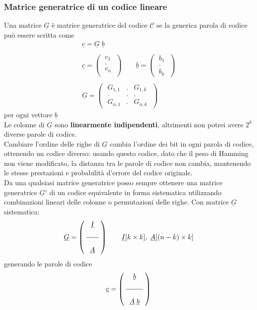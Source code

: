 \documentclass{article}
\begin{document}
\subsubsection{Matrice generatrice di un codice lineare}
Una matrice $\underline{G}$ è matrice generatrice del codice $\mathcal{C}$ se la generica parola di codice può essere scritta come 
\begin{gather*}
	\underline{c}=\underline{G}\;\underline{b}\\\\
	\underline{c}=
	\left (\;
	\begin{array}{c}
		c_1\\
		.\\
		c_n\\
	\end{array}
	\;\right )\qquad
	\underline{b}=
	\left(\;
	\begin{array}{c}
		b_1\\
		.\\
		b_k
	\end{array}
	\;\right)\\\\
	\underline{G}=
	\left(\;
	\begin{array}{ccc}
		G_{1,1}&.&G_{1,k}\\
		.&.&.\\
		G_{n,1}&.&G_{n,k}
	\end{array}
	\;\right
	)
\end{gather*}
per ogni vettore $\underline{b}$\\
Le colonne di $\underline{G}$ sono \textbf{linearmente indipendenti}, altrimenti non potrei avere $2^k$ diverse parole di codice.\\
Cambiare l'ordine delle righe di $\underline{G}$ cambia l'ordine dei bit in ogni parola di codice, ottenendo un codice diverso: usando questo codice, dato che il peso di Hamming non viene modificato, la distanza tra le parole di codice non cambia, mantenendo le stesse prestazioni e probabilità d'errore del codice originale.\\
Da una qualsiasi matrice generatrice posso sempre ottenere una matrice generatrice $\underline{G}'$ di un codice equivalente in forma sistematica utilizzando combinazioni lineari delle colonne o permutazioni delle righe.\newpage
Con matrice $\underline{G}$ sistematica:
$$\underline{G}=
\left(\;\begin{array}{c}\underline{I}\\\\
	\hline\\
	\underline{A}
\end{array}\;\right)\qquad\underline{I}[k\times k],\;\underline{A}[(n-k)\times k]$$
generando le parole di codice
$$\underline{c}=
\left(\;\begin{array}{c}\underline{b}\\\\
	\hline\\
	\underline{A}\;\underline{b}
\end{array}\;\right)$$
\end{document}
